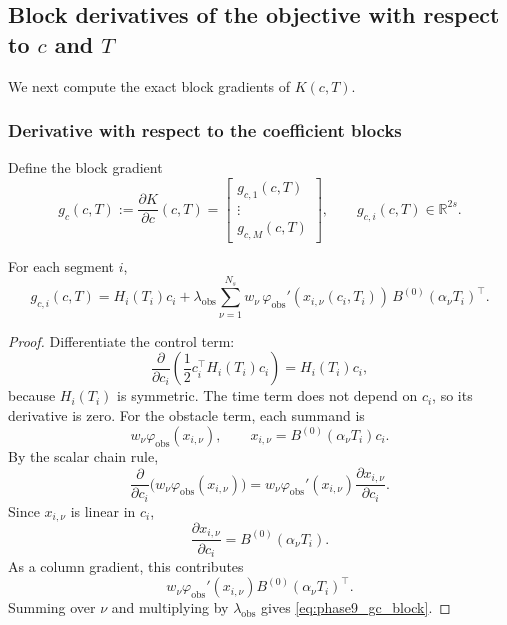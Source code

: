 \subsection{Block derivatives of the objective with respect to \texorpdfstring{$c$}{c} and \texorpdfstring{$T$}{T}}
\label{subsec:phase9_block_derivatives}

We next compute the exact block gradients of \(K(c,T)\).

\subsubsection{Derivative with respect to the coefficient blocks}
\label{subsubsec:phase9_dKdc}

Define the block gradient
\[
g_c(c,T)
:=
\frac{\partial K}{\partial c}(c,T)
=
\begin{bmatrix}
g_{c,1}(c,T)\\
\vdots\\
g_{c,M}(c,T)
\end{bmatrix},
\qquad
g_{c,i}(c,T)\in\mathbb R^{2s}.
\]

\begin{proposition}
\label{prop:phase9_dKdc}
For each segment \(i\),
\begin{equation}
\label{eq:phase9_gc_block}
g_{c,i}(c,T)
=
H_i(T_i)c_i
+
\lambda_{\mathrm{obs}}
\sum_{\nu=1}^{N_s}
w_\nu\,
\varphi_{\mathrm{obs}}'(x_{i,\nu}(c_i,T_i))
\,B^{(0)}(\alpha_\nu T_i)^\top.
\end{equation}
\end{proposition}

\begin{proof}
Differentiate the control term:
\[
\frac{\partial}{\partial c_i}
\left(\frac12 c_i^\top H_i(T_i)c_i\right)
=
H_i(T_i)c_i,
\]
because \(H_i(T_i)\) is symmetric.
The time term does not depend on \(c_i\), so its derivative is zero.
For the obstacle term, each summand is
\[
w_\nu \varphi_{\mathrm{obs}}(x_{i,\nu}),
\qquad
x_{i,\nu}=B^{(0)}(\alpha_\nu T_i)c_i.
\]
By the scalar chain rule,
\[
\frac{\partial}{\partial c_i}
\bigl(w_\nu \varphi_{\mathrm{obs}}(x_{i,\nu})\bigr)
=
w_\nu \varphi_{\mathrm{obs}}'(x_{i,\nu})
\frac{\partial x_{i,\nu}}{\partial c_i}.
\]
Since \(x_{i,\nu}\) is linear in \(c_i\),
\[
\frac{\partial x_{i,\nu}}{\partial c_i}
=
B^{(0)}(\alpha_\nu T_i).
\]
As a column gradient, this contributes
\[
w_\nu \varphi_{\mathrm{obs}}'(x_{i,\nu})B^{(0)}(\alpha_\nu T_i)^\top.
\]
Summing over \(\nu\) and multiplying by \(\lambda_{\mathrm{obs}}\) gives \eqref{eq:phase9_gc_block}.
\end{proof}

